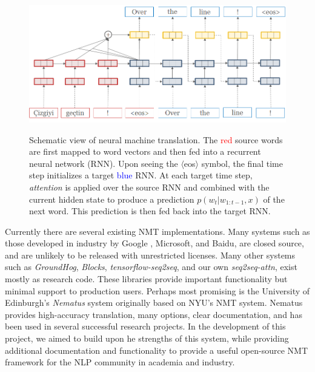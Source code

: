 \documentclass[11pt]{article}
\begin{document}
\begin{figure}
  \centering
  \includegraphics[width=\linewidth]{simple-attn}
  \label{fig:rnn}
  \caption{\small Schematic view of neural machine translation. The \textcolor{red}{red} source words are first mapped to word vectors and then fed into a recurrent neural network (RNN). Upon seeing the $\langle$eos$\rangle$ symbol, the final time step initializes a target \textcolor{blue}{blue} RNN. At each target time step, \textit{attention} is applied over the source RNN and combined with the current hidden state to produce a prediction $p(w_t| w_{1: t-1}, x)$ of the next word. This prediction is then fed back into the target RNN.}
\end{figure}


Currently there are several existing NMT implementations. Many systems
such as those developed in industry by Google \cite{wu2016google},
Microsoft, and Baidu, are closed source, and are unlikely to be
released with unrestricted licenses. Many other systems such as
\textit{GroundHog}, \textit{Blocks}, \textit{tensorflow-seq2seq}, and our own \textit{seq2seq-attn}, exist
mostly as research code. These libraries provide important
functionality but minimal support to production users. Perhaps most
promising is the University of Edinburgh's \textit{Nematus} system originally based on NYU's NMT system. Nematus provides high-accuracy translation, many options,
clear documentation, and has been used in several successful research
projects. In the development of this project, we aimed to build upon he strengths of this system, while providing additional documentation and functionality to provide a
useful open-source NMT framework for the NLP community in academia and
industry.
\end{document}
